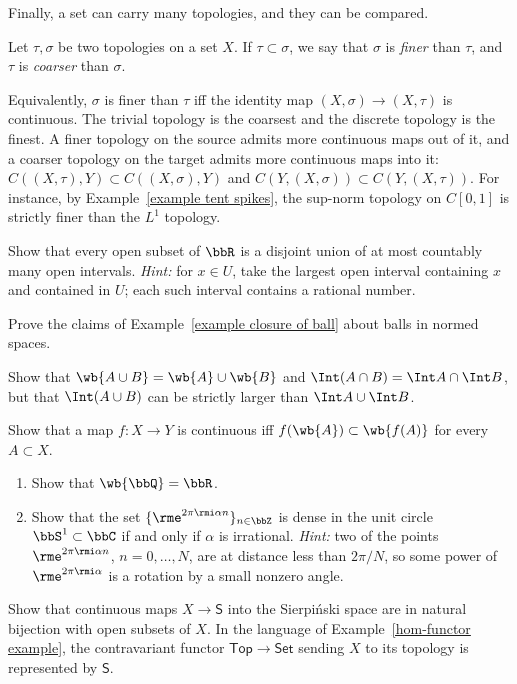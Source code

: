 Finally, a set can carry many topologies, and they can be compared.

\begin{defn}
    Let $\tau,\sigma$ be two topologies on a set $X$. If $\tau\subset\sigma$, we say that $\sigma$ is \emph{finer} than $\tau$, and $\tau$ is \emph{coarser} than $\sigma$.
\end{defn}

Equivalently, $\sigma$ is finer than $\tau$ iff the identity map $(X,\sigma)\to(X,\tau)$ is continuous. The trivial topology is the coarsest and the discrete topology is the finest. A finer topology on the source admits more continuous maps out of it, and a coarser topology on the target admits more continuous maps into it: $C((X,\tau),Y)\subset C((X,\sigma),Y)$ and $C(Y,(X,\sigma))\subset C(Y,(X,\tau))$. For instance, by Example~\ref{example tent spikes}, the sup-norm topology on $C[0,1]$ is strictly finer than the $L^1$ topology.

\begin{xca}\label{xca open sets in R}
    Show that every open subset of $\bbR$ is a disjoint union of at most countably many open intervals. \emph{Hint:} for $x\in U$, take the largest open interval containing $x$ and contained in $U$; each such interval contains a rational number.
\end{xca}
\begin{xca}\label{xca closure of ball}
    Prove the claims of Example~\ref{example closure of ball} about balls in normed spaces.
\end{xca}
\begin{xca}
    Show that $\wb{A\cup B}=\wb{A}\cup\wb{B}$ and $\Int(A\cap B)=\Int A\cap\Int B$, but that $\Int(A\cup B)$ can be strictly larger than $\Int A\cup\Int B$.
\end{xca}
\begin{xca}
    Show that a map $f:X\to Y$ is continuous iff $f(\wb{A})\subset\wb{f(A)}$ for every $A\subset X$.
\end{xca}
\begin{xca}\label{xca dense in circle}
    \begin{enumerate}
        \item Show that $\wb{\bbQ}=\bbR$.
        \item Show that the set $\{\rme^{2\pi\rmi \alpha n}\}_{n\in\bbZ}$ is dense in the unit circle $\bbS^1\subset \bbC$ if and only if $\alpha$ is irrational. \emph{Hint:} two of the points $\rme^{2\pi\rmi\alpha n}$, $n=0,\ldots,N$, are at distance less than $2\pi/N$, so some power of $\rme^{2\pi\rmi\alpha}$ is a rotation by a small nonzero angle.
    \end{enumerate}
\end{xca}
\begin{xca}\label{xca Sierpinski}
    Show that continuous maps $X\to\mathsf{S}$ into the Sierpi\'nski space are in natural bijection with open subsets of $X$. In the language of Example~\ref{hom-functor example}, the contravariant functor $\mathsf{Top}\to\mathsf{Set}$ sending $X$ to its topology is represented by $\mathsf{S}$.
\end{xca}


